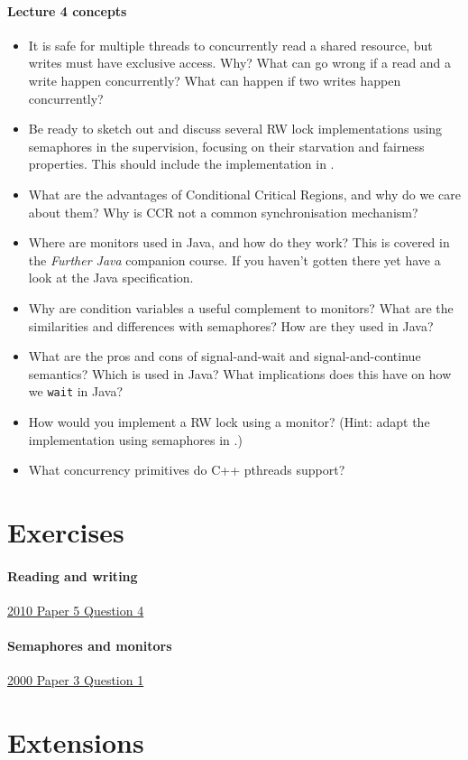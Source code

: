 \documentclass[12pt,a4paper,oneside,openright]{report}
\newcommand{\question}[2]{\paragraph{#1} #2}
\begin{document}
\question{Lecture 4 concepts}{
  \begin{itemize}
  \item It is safe for multiple threads to concurrently read a shared
    resource, but writes must have exclusive access. Why?  What can go
    wrong if a read and a write happen concurrently?  What can happen
    if two writes happen concurrently?
  \item Be ready to sketch out and discuss several RW lock
    implementations using semaphores in the supervision, focusing on
    their starvation and fairness properties. This should include the
    implementation in \cite[Chapter~11.5]{bacon2003operating}.
  \item What are the advantages of Conditional Critical Regions, and
    why do we care about them? Why is CCR not a common synchronisation
    mechanism?
  \item Where are monitors used in Java, and how do they work? This is
    covered in the \emph{Further Java} companion course. If you
    haven't gotten there yet have a look at the Java specification.
  \item Why are condition variables a useful complement to monitors?
    What are the similarities and differences with semaphores? How are
    they used in Java?
  \item What are the pros and cons of signal-and-wait and
    signal-and-continue semantics? Which is used in Java? What
    implications does this have on how we \texttt{wait} in Java?
  \item How would you implement a RW lock using a monitor? (Hint:
    adapt the implementation using semaphores in
    \cite[Chapter~11.5]{bacon2003operating}.)
  \item What concurrency primitives do C++ pthreads support?
  \end{itemize}
}


\section{Exercises}

\question{Reading and
  writing}{\href{https://www.cl.cam.ac.uk/teaching/exams/pastpapers/y2010p5q4.pdf}{2010
    Paper 5 Question 4}}

\question{Semaphores and
  monitors}{\href{https://www.cl.cam.ac.uk/teaching/exams/pastpapers/y2000p3q1.pdf}{2000
    Paper 3 Question 1}}

\section{Extensions}
\end{document}
